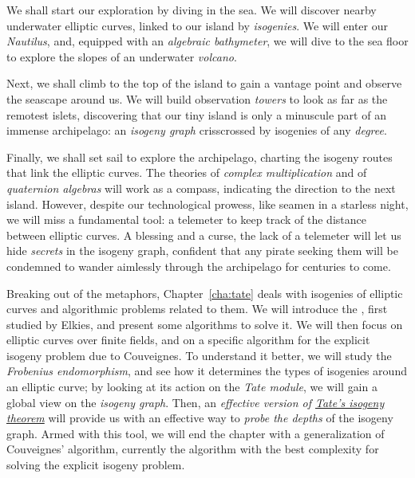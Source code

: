 \documentclass[b5layout]{hdr}
\begin{document}
We shall start our exploration by diving in the sea. %
We will discover nearby underwater elliptic curves, linked to our
island by \emph{isogenies}. %
We will enter our \emph{Nautilus}, and, equipped with an
\emph{algebraic bathymeter}, we will dive to the sea floor to explore
the slopes of an underwater \emph{volcano}. %

Next, we shall climb to the top of the island to gain a vantage point
and observe the seascape around us. %
We will build observation \emph{towers} to look as far as the remotest
islets, discovering that our tiny island is only a minuscule part of
an immense archipelago: an \emph{isogeny graph} crisscrossed by
isogenies of any \emph{degree}.

Finally, we shall set sail to explore the archipelago, charting the
isogeny routes that link the elliptic curves. %
The theories of \emph{complex multiplication} and of \emph{quaternion
  algebras} will work as a compass, indicating the direction to the
next island. %
However, despite our technological prowess, like seamen in a starless
night, we will miss a fundamental tool: a telemeter to keep track of
the distance between elliptic curves. %
A blessing and a curse, the lack of a telemeter will let us hide
\emph{secrets} in the isogeny graph, confident that any pirate seeking
them will be condemned to wander aimlessly through the archipelago for
centuries to come.

Breaking out of the metaphors, Chapter~\ref{cha:tate} deals with
isogenies of elliptic curves and algorithmic problems related to
them. %
We will introduce the , first studied by
Elkies, and present some algorithms to solve it. %
We will then focus on elliptic curves over finite fields, and on a
specific algorithm for the explicit isogeny problem due to
Couveignes. %
To understand it better, we will study the \emph{Frobenius
  endomorphism}, and see how it determines the types of isogenies
around an elliptic curve; by looking at its action on the \emph{Tate
  module}, we will gain a global view on the \emph{isogeny graph}. %
Then, an \emph{effective version of \hyperref[th:tate]{Tate's isogeny
    theorem}} will provide us with an effective way to \emph{probe the
  depths} of the isogeny graph. %
Armed with this tool, we will end the chapter with a generalization of
Couveignes' algorithm, currently the algorithm with the best
complexity for solving the explicit isogeny problem. %
\end{document}
